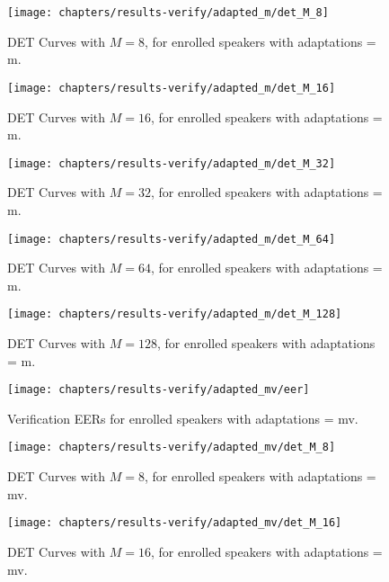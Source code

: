 \begin{figure}[ht]
	\centering
	\texttt{[image: chapters/results-verify/adapted\_m/det\_M\_8]}
	\caption{DET Curves with $M = 8$, for enrolled speakers with adaptations = m.}
	\label{fig:results-verify-adapted_m-M_8}
\end{figure}

\begin{figure}[ht]
	\centering
	\texttt{[image: chapters/results-verify/adapted\_m/det\_M\_16]}
	\caption{DET Curves with $M = 16$, for enrolled speakers with adaptations = m.}
	\label{fig:results-verify-adapted_m-M_16}
\end{figure}

\begin{figure}[ht]
	\centering
	\texttt{[image: chapters/results-verify/adapted\_m/det\_M\_32]}
	\caption{DET Curves with $M = 32$, for enrolled speakers with adaptations = m.}
	\label{fig:results-verify-adapted_m-M_32}
\end{figure}

\begin{figure}[ht]
	\centering
	\texttt{[image: chapters/results-verify/adapted\_m/det\_M\_64]}
	\caption{DET Curves with $M = 64$, for enrolled speakers with adaptations = m.}
	\label{fig:results-verify-adapted_m-M_64}
\end{figure}

\clearpage
\begin{figure}[ht]
	\centering
	\texttt{[image: chapters/results-verify/adapted\_m/det\_M\_128]}
	\caption{DET Curves with $M = 128$, for enrolled speakers with adaptations = m.}
	\label{fig:results-verify-adapted_m-M_128}
\end{figure}

\newpage


\begin{figure}[ht]
	\centering
	\texttt{[image: chapters/results-verify/adapted\_mv/eer]}
	\caption{Verification EERs for enrolled speakers with adaptations = mv.}
	\label{fig:results-verify-adapted_mv}
\end{figure}

\begin{figure}[ht]
	\centering
	\texttt{[image: chapters/results-verify/adapted\_mv/det\_M\_8]}
	\caption{DET Curves with $M = 8$, for enrolled speakers with adaptations = mv.}
	\label{fig:results-verify-adapted_mv-M_8}
\end{figure}

\begin{figure}[ht]
	\centering
	\texttt{[image: chapters/results-verify/adapted\_mv/det\_M\_16]}
	\caption{DET Curves with $M = 16$, for enrolled speakers with adaptations = mv.}
	\label{fig:results-verify-adapted_mv-M_16}
\end{figure}

